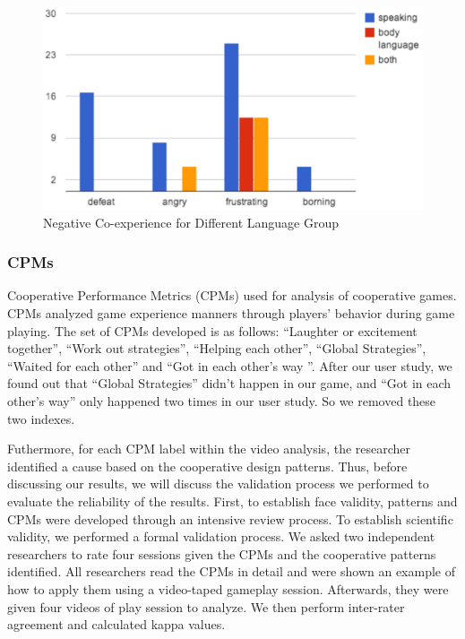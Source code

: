 \begin{figure}[!h]
\centering
\includegraphics[width=0.9\columnwidth]{Figures/US_Co-ex_Dif_Neg.png}
\caption{Negative Co-experience for Different Language Group}
\label{fig:US_Co-ex_Dif_Neg}
\end{figure}


\subsubsection{CPMs}

Cooperative Performance Metrics (CPMs)\cite{CPMs} used for analysis of cooperative games. CPMs analyzed game experience manners through players' behavior during game playing. The set of CPMs developed is as follows: ``Laughter or excitement together'', ``Work out strategies'', ``Helping each other'', ``Global Strategies'', ``Waited for each other'' and ``Got in each other's way ''. 
After our user study, we found out that ``Global Strategies'' didn't happen in our game, and ``Got in each other's way'' only happened two times in our user study. So we removed these two indexes.

Futhermore, for each CPM label within the video analysis, the researcher identified a cause based on the cooperative design patterns. Thus, before discussing our results, we will discuss the validation process we performed to evaluate the reliability of the results. First, to establish face validity, patterns and CPMs were developed through an intensive review process. To establish scientific validity, we performed a formal validation process. We asked two independent researchers to rate four sessions given the CPMs and the cooperative patterns identified. All researchers read the CPMs in detail and were shown an example of how to apply them using a video-taped gameplay session. Afterwards, they were given four videos of play session to analyze. We then perform inter-rater agreement and calculated kappa values\cite{Kappa1,Kappa2}. 

